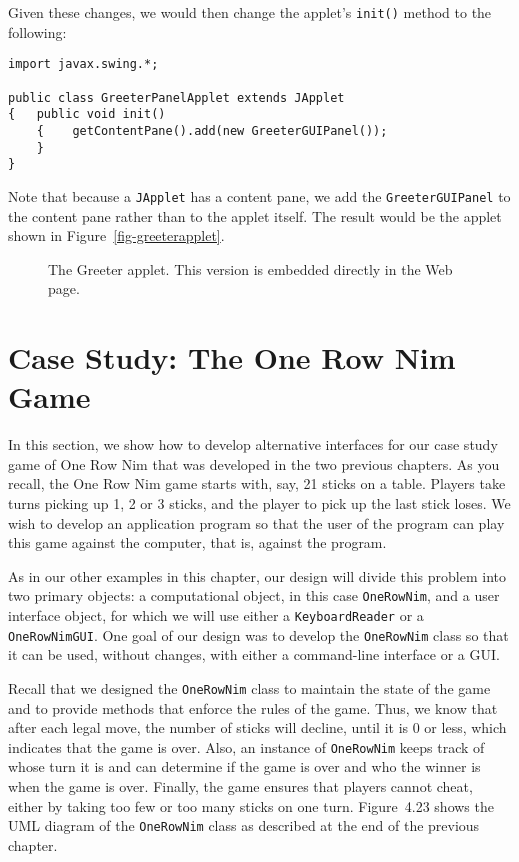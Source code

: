 Given these changes, we would then change the applet's {\tt init()} method
to the following:

\begin{jjjlisting}
\begin{lstlisting}
import javax.swing.*;

public class GreeterPanelApplet extends JApplet 
{   public void init() 
    {    getContentPane().add(new GreeterGUIPanel());
    }
}
\end{lstlisting}
\end{jjjlisting}

\noindent Note that because a {\tt JApplet} has a content pane,
we add the {\tt GreeterGUIPanel} to the content pane rather than
to the applet itself.  The result would be the applet 
shown in Figure~\ref{fig-greeterapplet}.

\begin{figure}[tb]
{The Greeter applet. This version is embedded directly in the 
Web page.
\label{fig-greeterapplet}
\label{pg-fig-greeterapplet}}
\end{figure}

\section{Case Study: The One Row Nim Game }

In this section, we show how to develop alternative interfaces for our
case study game of One Row Nim that was developed in the two previous
chapters. As you recall, the One Row Nim game starts with, say, 21
sticks on a table. Players take turns picking up 1, 2 or 3 sticks,
and the player to pick up the last stick loses.  We wish to 
develop an application program so that the user of the program
can play this game against the computer, that is, against the program. 

As in our other examples in this chapter, our design will divide this
problem into two primary objects: a computational object, in this case
{\tt OneRowNim}, and a user interface object, for which we will
use either a {\tt KeyboardReader} or a {\tt OneRowNimGUI}. One goal of
our design was to develop the {\tt OneRowNim} class so that it can be
used, without changes, with either a command-line interface or a GUI.

Recall that we designed the {\tt OneRowNim} class to maintain the state of
the game and to provide methods that enforce the rules of the
game. Thus, we know that after each legal move, the number of sticks will
decline, until it is 0 or less, which indicates that the game is over. 
Also, an instance of {\tt OneRowNim} keeps track of whose turn it is and 
can determine if the game is over and who the winner is when the
game is over.  Finally, the game ensures that players cannot cheat, either 
by taking too few or too many sticks on one turn. 
Figure~4.23 shows the UML diagram of the {\tt OneRowNim}
class as described at the end of the previous chapter. 



